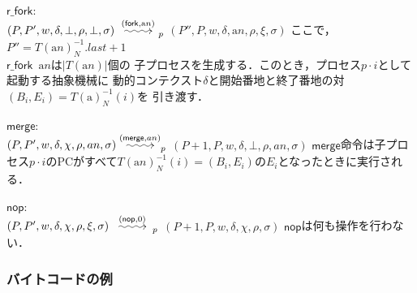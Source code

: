 \documentclass[submit,PRO]{ipsj}
\makeatletter
\newcommand{\longsquiggly}{\xymatrix{{}\ar@{~>}[r]&{}}}
\newcommand{\bcode}[1]{$\mathsf{#1}$}
\newcommand{\brightarrow}[1]{\stackrel{#1}{\longsquiggly}}
\newcommand{\alabel}[1]{\mathrm{a}#1}
\makeatother
\begin{document}
\begin{list}
\item \bcode{r\_fork}:\\
$(P,P',w,\delta,\bot,\rho,\bot,\sigma)\brightarrow{(\mathsf{fork},\alabel{n})}_p$\newline
\qquad $(P'',P,w,\delta,\alabel{n},\rho,\xi,\sigma)$\newline
ここで，$P''=T(\alabel{n})^{-1}_N.last+1$\\
\bcode{r\_fork}\ $\alabel{n}$は$|T(\alabel{n})|$個の
子プロセスを生成する．このとき，プロセス$p\cdot i$として起動する抽象機械に
動的コンテクスト$\delta$と開始番地と終了番地の対$(B_i,E_i)=T(\alabel)^{-1}_N(i)$を
引き渡す．
\item \bcode{merge}:\\
$(P,P',w,\delta,\chi,\rho,an,\sigma)\brightarrow{(\mathsf{merge},an)}_p$\newline
\qquad $(P+1,P,w,\delta,\bot,\rho,an,\sigma)$\newline
\bcode{merge}命令は子プロセス$p\cdot i$のPCがすべて$T(\alabel{n})^{-1}_N(i)=(B_i,E_i)$の$E_i$となったときに実行される．
\item \bcode{nop}:\\
$(P,P',w,\delta,\chi,\rho,\xi,\sigma)\brightarrow{(\mathsf{nop},0)}_p$\newline
\qquad $(P+1,P,w,\delta,\chi,\rho,\sigma)$\newline
\bcode{nop}は何も操作を行わない．

\end{list}

\subsubsection{バイトコードの例}
\end{document}
